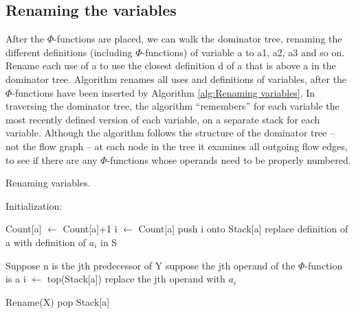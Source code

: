 \subsection{Renaming the variables}

After the $\Phi$-functions are placed, we can walk the dominator tree, renaming the different definitions (including $\Phi$-functions) of variable a to a1, a2, a3 and so on. Rename each use of a to use the closest definition d of a that is above a in the dominator tree. Algorithm  renames all uses and definitions of variables, after the $\Phi$-functions have been inserted by Algorithm \ref{alg:Renaming variables}. In traversing the dominator tree, the algorithm “remembers” for each variable the most recently defined version of each variable, on a separate stack for each variable. Although the algorithm follows the structure of the dominator tree – not the flow graph – at each node in the tree it examines all outgoing flow edges, to see if there are any $\Phi$-functions whose operands need to be properly numbered.



\begin{algorithm}[H]
	\caption{Renaming variables.}\label{alg:Renaming variables}
	\begin{algorithmic}
		\State Initialization:

		\EndFor

		\EndFor
		\EndIf

		\State Count[a] $\gets$ Count[a]+1
		\State i $\gets$ Count[a]
		\State push i onto Stack[a]
		\State replace definition of a with definition of $a_i$ in S
		\EndFor
		\EndFor

		\State Suppose n is the jth predecessor of Y
		\State suppose the jth operand of the $\Phi$-function is a
		\State i $\gets$ top(Stack[a])
		\State replace the jth operand with $a_i$

		\EndFor
		\EndFor
		\State Rename(X)
		\EndFor
		\State pop Stack[a]
		\EndFor
		\EndFunction
	\end{algorithmic}
\end{algorithm}

